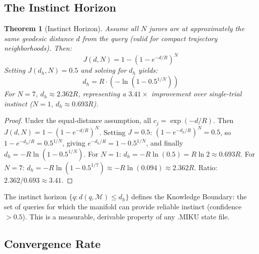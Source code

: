 \documentclass[11pt]{article}
\newtheorem{theorem}{Theorem}[section]
\begin{document}
\subsection{The Instinct Horizon}

\begin{theorem}[Instinct Horizon]\label{thm:horizon}
Assume all $N$ jurors are at approximately the same geodesic distance $d$ from the query (valid for compact trajectory neighborhoods). Then:
\begin{equation}
J(d, N) = 1 - (1 - e^{-d/R})^N
\end{equation}
Setting $J(d_h, N) = 0.5$ and solving for $d_h$ yields:
\begin{equation}\label{eq:horizon}
d_h = R \cdot (-\ln(1 - 0.5^{1/N}))
\end{equation}
For $N=7$, $d_h \approx 2.362 R$, representing a $3.41\times$ improvement over single-trial instinct ($N=1$, $d_h \approx 0.693 R$).
\end{theorem}
\begin{proof}
Under the equal-distance assumption, all $c_j = \exp(-d/R)$. Then $J(d,N) = 1 - (1 - e^{-d/R})^N$. Setting $J = 0.5$: $(1 - e^{-d_h/R})^N = 0.5$, so $1 - e^{-d_h/R} = 0.5^{1/N}$, giving $e^{-d_h/R} = 1 - 0.5^{1/N}$, and finally $d_h = -R \ln(1 - 0.5^{1/N})$. For $N=1$: $d_h = -R \ln(0.5) = R \ln 2 \approx 0.693R$. For $N=7$: $d_h = -R \ln(1 - 0.5^{1/7}) \approx -R \ln(0.094) \approx 2.362R$. Ratio: $2.362/0.693 \approx 3.41$.
\end{proof}

The instinct horizon $\{q : d(q, \mathcal{M}) \le d_h\}$ defines the Knowledge Boundary: the set of queries for which the manifold can provide reliable instinct (confidence $>0.5$). This is a measurable, derivable property of any .MIKU state file.

\subsection{Convergence Rate}
\end{document}
